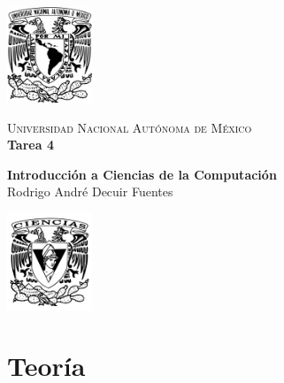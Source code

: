 \documentclass{report}
\begin{document}
    \begin{minipage}[t]{0.165 \textwidth}
       \begin{flushright}
        \includegraphics[width=1in]{EscudoUNAM.png}
       \end{flushright}
    \end{minipage}
    \begin{minipage}[H]{0.62 \textwidth}
        \begin{center}
            {\large \textsc{Universidad Nacional Autónoma de México}}
            \vspace{0.25cm}
            \\
            { \huge \textbf{Tarea 4}}
            \\
            \vspace{0.25cm}
            
            \textbf{Introducción a Ciencias de la Computación}
	   		\\
	        \vspace{0.25cm}
	        Rodrigo André Decuir Fuentes
            \vspace{0.2cm}
        \end{center}
        \vspace{0.05cm}
    \end{minipage}
    \begin{minipage}[t]{0.165 \textwidth}
        \begin{flushleft}
            \includegraphics[width=1in]{Fciencias_UNAM.png}
        \end{flushleft}
    \end{minipage}
\section*{Teoría}
\end{document}
